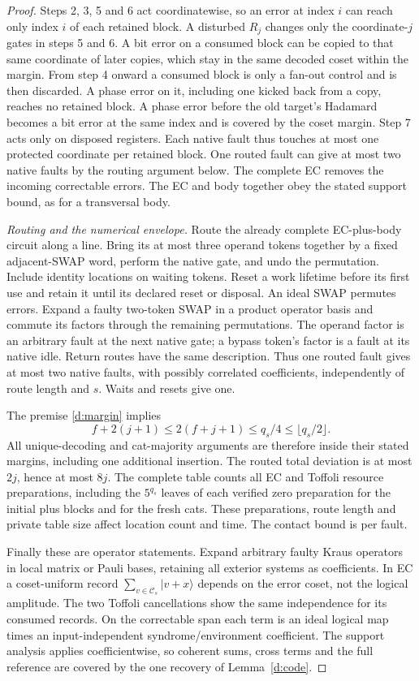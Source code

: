 \begin{proof}
Steps 2, 3, 5 and 6 act coordinatewise, so an error at index \(i\)
can reach only index \(i\) of each retained block. A disturbed \(R_j\)
changes only the coordinate-\(j\) gates in steps 5 and 6. A bit error
on a consumed block can be copied to that same coordinate of later
copies, which stay in the same decoded coset within the margin. From
step 4 onward a consumed block is only a fan-out control and is then
discarded.
A phase error on it, including one kicked back from a copy, reaches
no retained block. A phase error before the old target's Hadamard
becomes a bit error at the same index and is covered by the coset margin.
Step 7 acts only on disposed registers. Each native fault thus touches
at most one protected coordinate per retained block. One routed fault
can give at most two native faults by the routing argument below.
The complete EC removes the incoming correctable errors. The EC and
body together obey the stated support bound, as for a transversal body.

\smallskip\noindent
\emph{Routing and the numerical envelope.}
Route the already complete EC-plus-body circuit along a line. Bring
its at most three operand tokens together by a fixed adjacent-SWAP
word, perform the native gate, and undo the permutation. Include
identity locations on waiting tokens. Reset a work lifetime before
its first use and retain it until its declared reset or disposal.
An ideal SWAP permutes errors. Expand a faulty two-token SWAP in a
product operator basis and commute its factors through the remaining
permutations. The operand factor is an arbitrary fault at the next
native gate; a bypass token's factor is a fault at its native idle.
Return routes have the same description. Thus one routed fault gives
at most two native faults, with possibly correlated coefficients,
independently of route length and \(s\). Waits and resets give one.

The premise \eqref{d:margin} implies
\[
 f+2(j+1)\le2(f+j+1)\le q_s/4\le\lfloor q_s/2\rfloor.
\]
All unique-decoding and cat-majority arguments are therefore inside
their stated margins, including one additional insertion. The routed
total deviation is at most \(2j\), hence at most \(8j\).
The complete table counts all EC and Toffoli resource preparations,
including the \(5^{q_s}\) leaves of each verified zero preparation for
the initial plus blocks and for the fresh cats. These preparations,
route length and private table size affect location count and time.
The contact bound is per fault.

Finally these are operator statements. Expand arbitrary faulty Kraus
operators in local matrix or Pauli bases, retaining all exterior
systems as coefficients. In EC a coset-uniform record
\(\sum_{v\in\mathcal C_s}|v+x\rangle\) depends on the error coset,
not the logical amplitude. The two Toffoli cancellations show the
same independence for its consumed records. On the correctable span
each term is an ideal logical map times an input-independent
syndrome/environment coefficient. The support analysis applies
coefficientwise, so coherent sums, cross terms and the full reference
are covered by the one recovery of Lemma~\ref{d:code}.
\end{proof}

